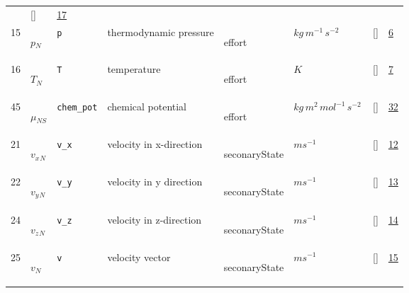 \begin{longtable}{|p{1cm}|p{3cm}|p{3cm}|p{7cm}|p{3.0cm}|p{3cm}|p{2cm}|p{1cm}|}
             & []
             & \hyperlink{"e:17"}{ 17 }
                 \\
    15
             & \hypertarget{"v:15"}{ $ {p}{_{N}} $}
             & \verb|p|
             & thermodynamic pressure
             & \begin{lay}effort \end{lay}
             & $ kg \,m^{-1} \,s^{-2} \, $
             & []
             & \hyperlink{"e:6"}{ 6 }
                 \\
    16
             & \hypertarget{"v:16"}{ $ {T}{_{N}} $}
             & \verb|T|
             & temperature
             & \begin{lay}effort \end{lay}
             & $ K \, $
             & []
             & \hyperlink{"e:7"}{ 7 }
                 \\
    45
             & \hypertarget{"v:45"}{ $ {\mu}{_{{N S}}} $}
             & \verb|chem_pot|
             & chemical potential
             & \begin{lay}effort \end{lay}
             & $ kg \,m^{2} \,mol^{-1} \,s^{-2} \, $
             & []
             & \hyperlink{"e:32"}{ 32 }
                 \\
    21
             & \hypertarget{"v:21"}{ $ {v_x}{_{N}} $}
             & \verb|v_x|
             & velocity in x-direction
             & \begin{lay}seconaryState \end{lay}
             & $ m s^{-1} \, $
             & []
             & \hyperlink{"e:12"}{ 12 }
                 \\
    22
             & \hypertarget{"v:22"}{ $ {v_y}{_{N}} $}
             & \verb|v_y|
             & velocity in y direction
             & \begin{lay}seconaryState \end{lay}
             & $ m s^{-1} \, $
             & []
             & \hyperlink{"e:13"}{ 13 }
                 \\
    24
             & \hypertarget{"v:24"}{ $ {v_z}{_{N}} $}
             & \verb|v_z|
             & velocity in z-direction
             & \begin{lay}seconaryState \end{lay}
             & $ m s^{-1} \, $
             & []
             & \hyperlink{"e:14"}{ 14 }
                 \\
    25
             & \hypertarget{"v:25"}{ $ {v}{_{N}} $}
             & \verb|v|
             & velocity vector
             & \begin{lay}seconaryState \end{lay}
             & $ m s^{-1} \, $
             & []
             & \hyperlink{"e:15"}{ 15 }
                 \\
    \end{longtable}